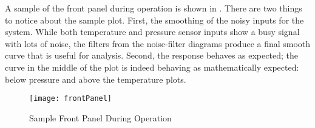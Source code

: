 \documentclass[main.tex]{subfile}
\begin{document}
A sample of the front panel during operation is shown in .
There are two things to notice about the sample plot. First, the smoothing of
the noisy inputs for the system. While both temperature and pressure sensor
inputs show a busy signal with lots of noise, the filters from the noise-filter
diagrams produce a final smooth curve that is useful for analysis. Second, the
response behaves as expected; the curve in the middle of the plot is indeed 
behaving as mathematically expected: below pressure and above the temperature plots.

\begin{figure}[h]
	\begin{center}
		\texttt{[image: frontPanel]}
	\end{center}
	\caption{Sample Front Panel During Operation}
	\label{fig:frontPanel}
\end{figure}


\end{document}
